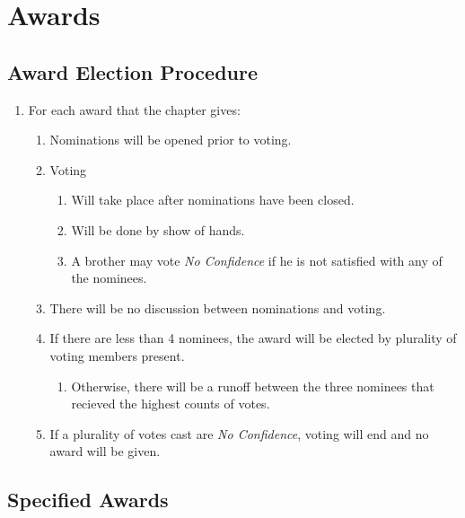 \chapter{Awards}

\section{Award Election Procedure}
	\label{awards-procedure}

	\begin{enumerate}
		\item For each award that the chapter gives:
			
			\begin{enumerate}
				\item Nominations will be opened prior to voting.
				\item Voting
					\label{award-voting}
					\begin{enumerate}
						\item Will take place after nominations have been closed.
						\item Will be done by show of hands.
						\item A brother may vote \emph{No Confidence} if he is not satisfied with any of the nominees.
					\end{enumerate}
				\item There will be no discussion between nominations and voting. \label{award-discussion}
				\item If there are less than 4 nominees, the award will be elected by plurality of voting members present. 
					\begin{enumerate}
						\item Otherwise, there will be a runoff between the three nominees that recieved the highest counts of votes.
					\end{enumerate}
				\item If a plurality of votes cast are \emph{No Confidence}, voting will end and no award will be given.
			\end{enumerate}

	\end{enumerate}

\section{Specified Awards}

